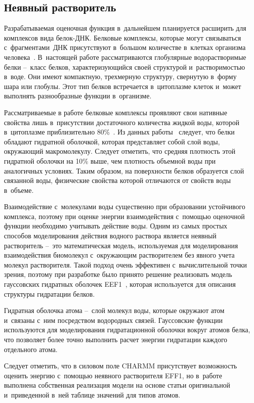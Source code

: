 \subsection{Неявный растворитель}

Разрабатываемая оценочная функция в~дальнейшем планируется расширить для комплексов вида белок-ДНК. Белковые комплексы, которые могут связываться с~фрагментами~ДНК присутствуют в~большом количестве в~клетках организма человека~\cite{belov}. В~настоящей работе рассматриваются глобулярные водорастворимые белки --~класс белков, характеризующийся своей структурой и~растворимостью в~воде. Они имеют компактную, трехмерную структуру, свернутую в~форму шара или глобулы. Этот тип белков встречается в~цитоплазме клеток и~может выполнять разнообразные функции в~организме. 

Рассматриваемые в работе белковые комплексы проявляют свои нативные свойства лишь в~присутствии достаточного количества жидкой воды, которой в~цитоплазме приблизительно 80\%~\cite{water}. Из данных работы~\cite{wtwt} следует, что белки обладают гидратной оболочкой, которая представляет собой слой воды, окружающий макромолекулу. Следует отметить, что средняя плотность этой гидратной оболочки на 10\% выше, чем плотность объемной воды при аналогичных условиях. Таким образом, на поверхности белков образуется слой связанной воды, физические свойства которой отличаются от свойств воды в~объеме.

Взаимодействие с~молекулами воды существенно при образовании устойчивого комплекса, поэтому при оценке энергии взаимодействия с~помощью оценочной функции необходимо учитывать действие воды. Одним из самых простых способов моделирования действия водного раствора является неявный растворитель --~это математическая модель, используемая для моделирования взаимодействия биомолекул с~окружающим растворителем без явного учета молекул растворителя. Такой подход очень эффективен с~вычислительной точки зрения, поэтому при разработке было принято решение реализовать модель гауссовских гидратных оболочек EEF1~\cite{eef1}, которая используется для описания структуры гидратации белков. 

Гидратная оболочка атома --~слой молекул воды, которые окружают атом и~связаны с~ним посредством водородных связей. Гауссовские функции используются для моделирования гидратационной оболочки вокруг атомов белка, что позволяет более точно выполнить расчет энергии гидратации каждого отдельного атома. 

Следует отметить, что в силовом поле CHARMM присутствует возможность оценить энергию с~помощью неявного растворителя EFF1, но в~работе выполнена собственная реализация модели на основе статьи оригинальной~\cite{eef1} и~приведенной в~ней таблице значений для типов атомов. 

